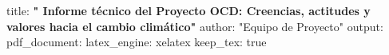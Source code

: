 

title: \textbf{" Informe técnico del Proyecto OCD: Creencias, actitudes y valores hacia el cambio climático"}
author: "Equipo de Proyecto"
output:
  pdf_document:
    latex_engine: xelatex
    keep_tex: true
    

